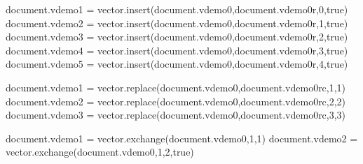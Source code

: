 \typebuffer[option=TEX] \getbuffer

\startlinecorrection
{} {}
    {} {}
    {} {}
    {} {}
    {} {}
\stopcombination
\stoplinecorrection

\startbuffer
\startluacode
document.vdemo1 = vector.insert(document.vdemo0,document.vdemo0r,0,true)
document.vdemo2 = vector.insert(document.vdemo0,document.vdemo0r,1,true)
document.vdemo3 = vector.insert(document.vdemo0,document.vdemo0r,2,true)
document.vdemo4 = vector.insert(document.vdemo0,document.vdemo0r,3,true)
document.vdemo5 = vector.insert(document.vdemo0,document.vdemo0r,4,true)
\stopluacode
\stopbuffer

\typebuffer[option=TEX] \getbuffer

\startlinecorrection
{} {}
    {} {}
    {} {}
    {} {}
    {} {}
\stopcombination
\stoplinecorrection

\startbuffer
\startluacode
document.vdemo1 = vector.replace(document.vdemo0,document.vdemo0rc,1,1)
document.vdemo2 = vector.replace(document.vdemo0,document.vdemo0rc,2,2)
document.vdemo3 = vector.replace(document.vdemo0,document.vdemo0rc,3,3)
\stopluacode
\stopbuffer

\typebuffer[option=TEX] \getbuffer

\startlinecorrection
{} {}
    {} {}
    {} {}
\stopcombination
\stoplinecorrection

\startbuffer
\startluacode
document.vdemo1 = vector.exchange(document.vdemo0,1,1)
document.vdemo2 = vector.exchange(document.vdemo0,1,2,true)
\stopluacode
\stopbuffer

\typebuffer[option=TEX] \getbuffer

\startlinecorrection
{} {}
    {} {}
\stopcombination
\stoplinecorrection

